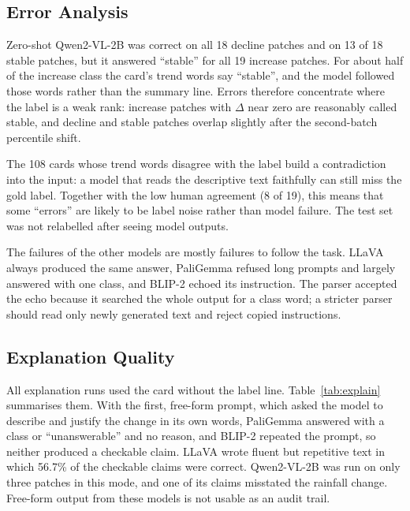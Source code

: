 \documentclass[11pt]{article}
\begin{document}
\subsection{Error Analysis}

Zero-shot Qwen2-VL-2B was correct on all 18 decline patches and on 13 of
18 stable patches, but it answered ``stable'' for all 19 increase
patches. For about half of the increase class the card's trend words
say ``stable'', and the model followed those words rather than the
summary line. Errors therefore concentrate where the label is a weak
rank: increase patches with $\Delta$ near zero are reasonably called
stable, and decline and stable patches overlap slightly after the
second-batch percentile shift.

The 108 cards whose trend words disagree with the label build a
contradiction into the input: a model that reads the descriptive text
faithfully can still miss the gold label. Together with the low human
agreement (8 of 19), this means that some ``errors'' are likely to be
label noise rather than model failure. The test set was not relabelled
after seeing model outputs.

The failures of the other models are mostly failures to follow the task.
LLaVA always produced the same answer, PaliGemma refused long prompts
and largely answered with one class, and BLIP-2 echoed its instruction.
The parser accepted the echo because it searched the whole output for a
class word; a stricter parser should read only newly generated text and
reject copied instructions.

\subsection{Explanation Quality}
\label{sec:expl}

All explanation runs used the card without the label line.
Table~\ref{tab:explain} summarises them. With the first, free-form
prompt, which asked the model to describe and justify the change in its
own words, PaliGemma answered with a class or ``unanswerable'' and no
reason, and BLIP-2 repeated the prompt, so neither produced a checkable
claim. LLaVA wrote fluent but repetitive text in which 56.7\% of the
checkable claims were correct. Qwen2-VL-2B was run on only three
patches in this mode, and one of its claims misstated the rainfall
change. Free-form output from these models is not usable as an audit
trail.
\end{document}
